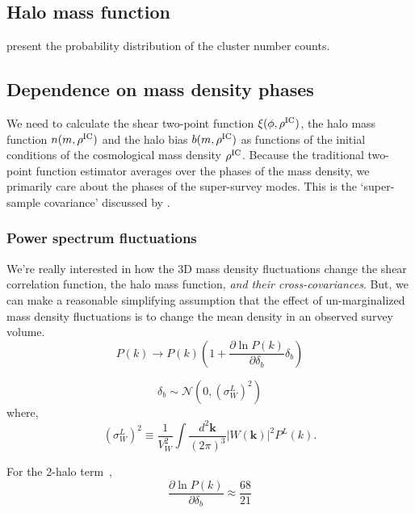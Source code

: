 \documentclass[preprint]{aastex}
\newcommand{\kv}{\mathbf{k}}
\newcommand{\skyangle}{\phi}
\newcommand{\rhoic}{\rho^{\rm IC}}
\newcommand{\normdist}{\mathcal{N}}
\begin{document}
\subsection{Halo mass function}
\citet{lima2004} present the probability distribution of the cluster number counts.

\subsection{Dependence on mass density phases} %
\label{sub:dependence_on_mass_density_phases}
We need to calculate the shear two-point function $\xi(\skyangle, \rhoic)$, 
the halo mass function $n(m, \rhoic)$
and the halo bias $b(m, \rhoic)$ as functions of the initial conditions of the 
cosmological mass density $\rhoic$. 
Because the traditional two-point function estimator averages over the phases 
of the mass density, we primarily care about the phases of the super-survey 
modes. This is the `super-sample covariance' discussed by 
\citet{takada2013}.

\subsubsection{Power spectrum fluctuations}
We're really interested in how the 3D mass density fluctuations change the
shear correlation function, the halo mass function, \emph{and their 
cross-covariances}. But, we can make a reasonable simplifying assumption that 
the effect of un-marginalized mass density fluctuations is to change the mean density 
in an observed survey volume. 
\begin{equation}
	P(k) \rightarrow P(k) \left(
	1 + \frac{\partial \ln P(k)}{\partial \delta_b} \delta_b\right)
\end{equation}

\begin{equation}
	\delta_b \sim \normdist
	\left(0, \left(\sigma_W^L\right)^{2}\right)
\end{equation}
where,
\begin{equation}
	\left(\sigma_{W}^{L}\right)^{2} \equiv
	\frac{1}{V_{W}^{2}} 
	\int \frac{d^{2}\kv}{(2\pi)^3}
	\left|W(\kv)\right|^{2}
	P^{L}(k).
\end{equation}

For the 2-halo term~\citep[eq. 39 of][]{takada2013}, 
\begin{equation}
	\frac{\partial \ln P(k)}{\partial \delta_b} \approx 
	\frac{68}{21}
\end{equation}
\end{document}
